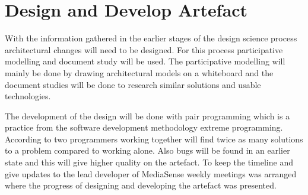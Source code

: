 \section{Design and Develop Artefact}
With the information gathered in the earlier stages of the design science process architectural changes will need to be designed. For this process participative modelling \cite{johannesson2012design} and document study will be used. The participative modelling will mainly be done by drawing architectural models on a whiteboard and the document studies will be done to research similar solutions and usable technologies. 

The development of the design will be done with pair programming \cite{williams2000all} which is a practice from the software development methodology extreme programming. According to  \cite{williams2000all} two programmers working together will find twice as many solutions to a problem compared to working alone. Also bugs will be found in an earlier state and this will give higher quality on the artefact. To keep the timeline and give updates to the lead developer of MediaSense weekly meetings was arranged where the progress of designing and developing the artefact was presented. 
